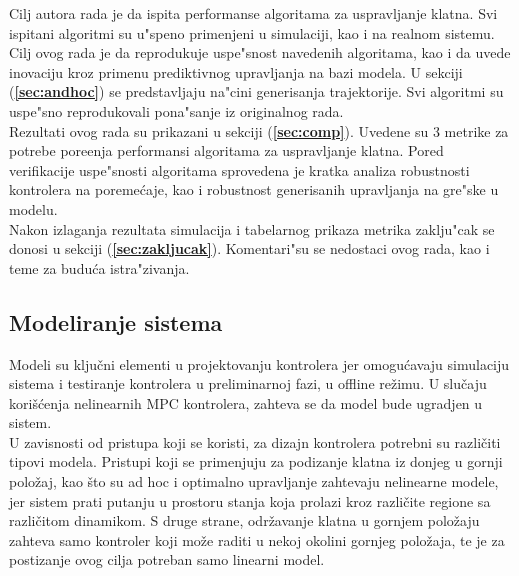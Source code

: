 \documentclass[a4paper,11pt]{article}
\theoremstyle{definition} \newtheorem{deff}{Definicija}[section]
\theoremstyle{definition} \newtheorem{prim}[deff]{Primer}
\theoremstyle{plain} \newtheorem{teor}[deff]{Teorema}
\begin{document}
	Cilj autora rada \cite{inicijalna} je da ispita performanse algoritama za uspravljanje klatna. Svi ispitani algoritmi su u"speno primenjeni u simulaciji, kao i na realnom sistemu. Cilj ovog rada je da reprodukuje uspe"snost navedenih algoritama, kao i da uvede inovaciju kroz primenu prediktivnog upravljanja na bazi modela. U sekciji (\textbf{\ref{sec:andhoc}}) se predstavljaju na"cini generisanja trajektorije. Svi algoritmi su uspe"sno reprodukovali pona"sanje iz originalnog rada.\\
	
	Rezultati ovog rada su prikazani u sekciji (\textbf{\ref{sec:comp}}). Uvedene su 3 metrike za potrebe pore\dj enja performansi algoritama za uspravljanje klatna. Pored verifikacije uspe"snosti algoritama sprovedena je kratka analiza robustnosti kontrolera na poreme\'caje, kao i robustnost generisanih upravljanja na gre"ske u modelu. \\
	
	Nakon izlaganja rezultata simulacija i tabelarnog prikaza metrika zaklju"cak se donosi u sekciji (\textbf{\ref{sec:zakljucak}}). Komentari"su se nedostaci ovog rada, kao i teme za budu\'ca istra"zivanja.
	
	
	
	
	
	
	
	
	
	
	
	
	\newpage
	
	\subsection{Modeliranje sistema}\label{sec:modeliranje}
	
	Modeli su ključni elementi u projektovanju kontrolera jer omogućavaju simulaciju sistema i testiranje kontrolera u preliminarnoj fazi, u offline režimu. U slučaju korišćenja nelinearnih MPC kontrolera, zahteva se da model bude ugradjen u sistem.  \\
	
	U zavisnosti od pristupa koji se koristi, za dizajn kontrolera potrebni su različiti tipovi modela. Pristupi koji se primenjuju za podizanje klatna iz donjeg u gornji položaj, kao što su ad hoc i optimalno upravljanje zahtevaju nelinearne modele, jer sistem prati putanju u prostoru stanja koja prolazi kroz različite regione sa različitom dinamikom. S druge strane, održavanje klatna u gornjem položaju zahteva samo kontroler koji može raditi u nekoj okolini gornjeg položaja, te je za postizanje ovog cilja potreban samo linearni model.  \\
	
\end{document}
